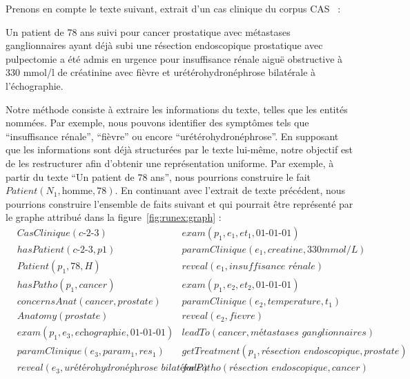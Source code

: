 \begin{example}
    \label{ex:runex}
    Prenons en compte le texte suivant, extrait d'un cas clinique du corpus CAS~\cite{grabarCASFrenchCorpus2018} :
    \begin{displayquote}
        Un patient de 78 ans suivi pour cancer prostatique avec métastases ganglionnaires ayant déjà subi une résection endoscopique prostatique avec pulpectomie a été admis en urgence pour insuffisance rénale aiguë obstructive à 330 mmol/l de créatinine avec fièvre et urétérohydronéphrose bilatérale à l'échographie.
    \end{displayquote}

    Notre méthode consiste à extraire les informations du texte, telles que les entités nommées.
    Par exemple, nous pouvons identifier des symptômes tels que \enquote{insuffisance rénale}, \enquote{fièvre} ou encore \enquote{urétérohydronéphrose}.
    En supposant que les informations sont déjà structurées par le texte lui-même, notre objectif est de les restructurer afin d'obtenir une représentation uniforme.
    Par exemple, à partir du texte \enquote{Un patient de 78 ans}, nous pourrions construire le fait $Patient(N_1, \text{homme}, 78)$.
    En continuant avec l'extrait de texte précédent, nous pourrions construire l'ensemble de faits suivant et qui pourrait être représenté par le graphe attribué dans la figure~\ref{fig:runex:graph} :
    \begin{align*}
        & CasClinique(\textit{c-2-3})                             & & exam(p_1, e_1, et_1, \textit{01-01-01})                      \\
        & hasPatient(\textit{c-2-3}, p1)                          & & paramClinique(e_1, creatine, \textit{330mmol/L})             \\
        & Patient(p_1, 78, H)                                     & & reveal(e_1, \textit{insuffisance rénale})                    \\
        & hasPatho(p_1, cancer)                                   & & exam(p_1, e_2, et_2, \textit{01-01-01})                      \\
        & concernsAnat(cancer, prostate)                          & & paramClinique(e_2, temperature, t_1)                         \\
        & Anatomy(prostate)                                       & & reveal(e_2, fievre)                                          \\
        & exam(p_1, e_3, \textit{echographie}, \textit{01-01-01}) & & leadTo(cancer, \textit{métastases ganglionnaires})           \\
        & paramClinique(e_3, param_1, res_1)                      & & getTreatment(p_1, \textit{résection endoscopique}, prostate) \\
        & reveal(e_3, \textit{urétérohydronéphrose bilatérale})   & & forPatho(\textit{résection endoscopique}, cancer)
    \end{align*}


\end{example}
